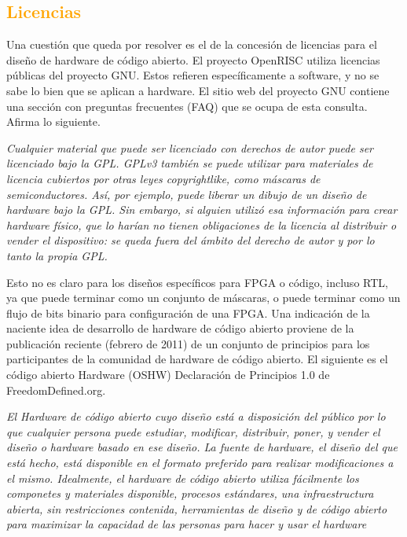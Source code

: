 \documentclass[a4paper,11pt]{article}
\begin{document}
		\subsection{\textcolor{orange}{Licencias}}

Una cuestión que queda por resolver es el de la concesión de licencias para el diseño de hardware de código abierto. El proyecto OpenRISC utiliza licencias públicas del proyecto GNU. Estos refieren específicamente a software, y no se sabe lo bien que se aplican a hardware.
El sitio web del proyecto GNU contiene una sección con preguntas frecuentes (FAQ) que se ocupa de esta consulta. Afirma lo siguiente.

\textit{Cualquier material que puede ser licenciado con derechos de autor puede ser licenciado bajo la GPL.
GPLv3 también se puede utilizar para materiales de licencia cubiertos por otras leyes copyrightlike, como máscaras de semiconductores. Así, por ejemplo, puede liberar un dibujo de un diseño de hardware bajo la GPL. Sin embargo, si
alguien utilizó esa información para crear hardware físico, que lo harían
no tienen obligaciones de la licencia al distribuir o vender el dispositivo: se
queda fuera del ámbito del derecho de autor y por lo tanto la propia GPL.}

Esto no es claro para los diseños específicos para FPGA o código, incluso RTL, ya que puede terminar como un conjunto de máscaras, o puede terminar como un flujo de bits binario para configuración de una FPGA.
Una indicación de la naciente idea de desarrollo de hardware de código abierto proviene de la publicación reciente (febrero de 2011) de un conjunto de principios para los participantes de la comunidad de hardware de código abierto. El siguiente es el código abierto Hardware (OSHW) Declaración de Principios 1.0 de FreedomDefined.org.

\textit{El Hardware de código abierto cuyo diseño está a disposición del público
por lo que cualquier persona puede estudiar, modificar, distribuir, poner, y vender el
diseño o hardware basado en ese diseño. La fuente de hardware, el diseño
del que está hecho, está disponible en el formato preferido para realizar
modificaciones a el mismo. Idealmente, el hardware de código abierto utiliza fácilmente los componetes y materiales disponible, procesos estándares, una infraestructura abierta, sin restricciones
contenida, herramientas de diseño y de código abierto para maximizar la capacidad
de las personas para hacer y usar el hardware} %
\end{document}
